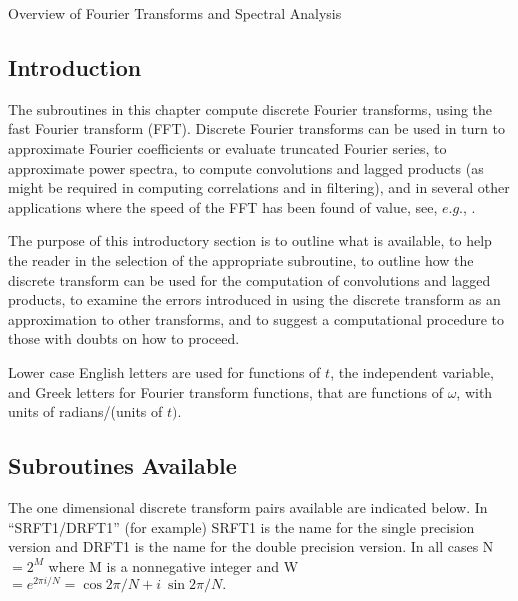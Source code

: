 \documentclass[twoside]{MATH77}
\begin{document}
 Overview of Fourier Transforms and Spectral Analysis


\subsection{Introduction}

The subroutines in this chapter compute discrete Fourier transforms,
using the fast Fourier transform (FFT). Discrete Fourier transforms
can be used in turn to approximate Fourier coefficients or evaluate
truncated Fourier series, to approximate power spectra, to compute
convolutions and lagged products (as might be required in computing
correlations and in filtering), and in several other applications
where the speed of the FFT has been found of value, see, $e.g.$,
\cite{Cooley:1966:AFF}.

The purpose of this introductory section is to outline what is
available, to help the reader in the selection of the appropriate
subroutine, to outline how the discrete transform can be used for the
computation of convolutions and lagged products, to examine the
errors introduced in using the discrete transform as an approximation
to other transforms, and to suggest a computational procedure to
those with doubts on how to proceed.

Lower case English letters are used for functions of $t$, the
independent variable, and Greek letters for Fourier transform
functions, that are functions of $\omega $, with units of
radians/(units of $t)$.

\subsection{Subroutines Available}

The one dimensional discrete transform pairs available are indicated
below.  In ``SRFT1/DRFT1'' (for example) SRFT1 is the name for the
single precision version and DRFT1 is the name for the double
precision version. In all cases N $=2^M$ where M is a nonnegative
integer and W $=e^{2\pi i/N}=\cos 2\pi /{N} +i\ \sin 2\pi /N.$
\end{document}
